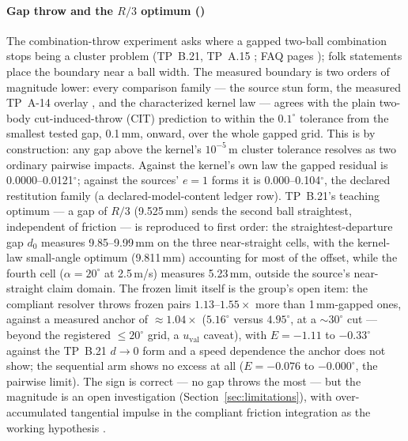 \paragraph{Gap throw and the $R/3$ optimum ()}
The combination-throw experiment asks where a gapped two-ball combination
stops being a cluster problem (TP~B.21, TP~A.15
\citep{alciatore_tp_catalog}; FAQ pages \citep{alciatore_faq}); folk
statements place the boundary near a ball width. The measured boundary is
two orders of magnitude lower: every comparison family --- the source
stun form, the measured TP~A-14 overlay \citep{alciatore_tp_a14}, and the
characterized kernel law --- agrees with the plain two-body
cut-induced-throw (CIT) prediction to within the $0.1^\circ$ tolerance
from the smallest tested gap, 0.1\,mm, onward, over the whole gapped
grid. This is by construction: any gap above the kernel's
$10^{-5}$\,m cluster tolerance resolves as two ordinary pairwise impacts.
Against the kernel's own law the gapped residual is
0.0000--0.0121$^\circ$; against the sources' $e = 1$ forms it is
0.000--0.104$^\circ$, the declared restitution family (a
declared-model-content ledger row). TP~B.21's teaching optimum --- a gap of
$R/3$ (9.525\,mm) sends the second ball straightest, independent of
friction --- is reproduced to first order: the straightest-departure gap
$d_0$ measures 9.85--9.99\,mm on the three near-straight cells, with the
kernel-law small-angle optimum (9.811\,mm) accounting for most of the
offset, while the fourth cell ($\alpha = 20^\circ$ at 2.5\,m/s) measures
5.23\,mm, outside the source's near-straight claim domain. The frozen
limit itself is the group's open item: the compliant resolver throws
frozen pairs $1.13$--$1.55\times$ more than 1\,mm-gapped ones, against a
measured anchor of ${\approx}1.04\times$ ($5.16^\circ$ versus
$4.95^\circ$, at a ${\sim}30^\circ$ cut --- beyond the registered
$\leq 20^\circ$ grid, a $u_{\mathrm{val}}$ caveat), with
$E = -1.11$ to $-0.33^\circ$ against the TP~B.21 $d \to 0$ form and a
speed dependence the anchor does not show; the sequential arm shows no
excess at all ($E = -0.076$ to $-0.000^\circ$, the pairwise limit). The
sign is correct --- no gap throws the most --- but the magnitude is an
open investigation (Section~\ref{sec:limitations}), with
over-accumulated
tangential impulse in the compliant friction integration as the working
hypothesis \citep[cf.][]{cross2023oblique}.

